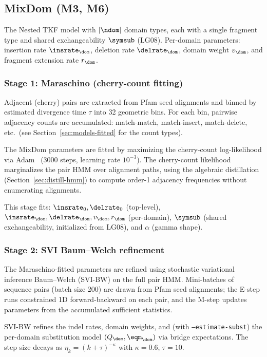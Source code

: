 \subsection{MixDom (M3, M6)}
\label{sec:mixdom-static-fitting}

The Nested TKF model with $|\ndom|$ domain types, each with
a single fragment type and shared exchangeability $\symsub$ (LG08).
Per-domain parameters: insertion rate $\insrate_\dom$,
deletion rate $\delrate_\dom$, domain weight $v_\dom$,
and fragment extension rate $r_\dom$.

\subsubsection{Stage 1: Maraschino (cherry-count fitting)}

Adjacent (cherry) pairs are extracted from Pfam seed alignments
and binned by estimated divergence time $\tau$ into 32 geometric bins.
For each bin, pairwise adjacency counts are accumulated:
match-match, match-insert, match-delete, etc.\
(see Section~\ref{sec:models-fitted} for the count types).

The MixDom parameters are fitted by maximizing the cherry-count
log-likelihood via Adam~\cite{Adam} (3000 steps, learning rate $10^{-3}$).
The cherry-count likelihood marginalizes the pair HMM over
alignment paths, using the algebraic distillation
(Section~\ref{sec:distill-hmm}) to compute order-1 adjacency frequencies
without enumerating alignments.

This stage fits: $\insrate_0, \delrate_0$ (top-level),
$\insrate_\dom, \delrate_\dom, v_\dom, r_\dom$ (per-domain),
$\symsub$ (shared exchangeability, initialized from LG08),
and $\alpha$ (gamma shape).

\subsubsection{Stage 2: SVI Baum--Welch refinement}

The Maraschino-fitted parameters are refined using
stochastic variational inference Baum--Welch (SVI-BW)
on the full pair HMM.
Mini-batches of sequence pairs (batch size 200) are drawn from
Pfam seed alignments; the E-step runs constrained 1D forward-backward
on each pair, and the M-step updates parameters from
the accumulated sufficient statistics.

SVI-BW refines the indel rates, domain weights, and
(with \texttt{--estimate-subst}) the per-domain substitution model
$(Q_\dom, \eqm_\dom)$ via bridge expectations.
The step size decays as $\eta_k = (k + \tau)^{-\kappa}$
with $\kappa = 0.6$, $\tau = 10$.

